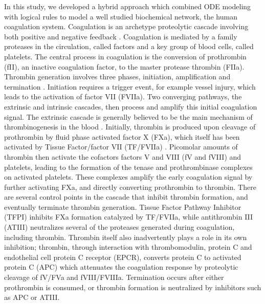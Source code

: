 \documentclass[processes,article,received,moreauthors,pdftex,12pt,a4paper]{mdpi}
\begin{document}
In this study, we developed a hybrid approach which combined ODE modeling with logical rules to model a well studied biochemical network, 
the human coagulation system. Coagulation is an archetype proteolytic cascade involving both positive 
and negative feedback \cite{Butenas:2002aa,Schenone:2004aa,Adams:2009aa}. 
Coagulation is mediated by a family proteases in the circulation, called factors and a key group of blood cells, called platelets. 
The central process in coagulation is the conversion of prothrombin (fII), an inactive coagulation factor, to the master protease thrombin (FIIa).
Thrombin generation involves three phases, initiation, amplification and termination \cite{GOLDHABER2006, Brummel:2002aa}.
Initiation requires a trigger event, for example vessel injury, which leads to the activation of factor VII (FVIIa).
Two converging pathways, the extrinsic and intrinsic cascades, then process and amplify this initial coagulation signal. 
The extrinsic cascade is generally believed to be the main mechanism of thrombinogenesis in the blood \cite{MANN1990,ROBERTS1998,MANN1999}.
Initially, thrombin is produced upon cleavage of prothrombin by fluid phase activated factor X (FXa), which itself has been activated by Tissue Factor/factor VII (TF/FVIIa) \cite{Butenas:2002aa}. 
Picomolar amounts of thrombin then activate the cofactors factors V and VIII (fV and fVIII) and platelets, 
leading to the formation of the tenase and prothrombinase complexes on activated platelets.
These complexes amplify the early coagulation signal by further activating FXa, and directly converting prothrombin to thrombin. 
There are several control points in the cascade that inhibit thrombin formation, and eventually terminate thrombin generation. 
Tissue Factor Pathway Inhibitor (TFPI) inhibits FXa formation catalyzed by TF/FVIIa, while antithrombin III (ATIII)
neutralizes several of the proteases generated during coagulation, including thrombin.  
Thrombin itself also inadvertently plays a role in its own inhibition; thrombin, through interaction with thrombomodulin, protein C and endothelial cell protein C receptor (EPCR),
converts protein C to activated protein C (APC) which attenuates the coagulation response by proteolytic cleavage of fV/FVa and fVIII/FVIIIa. 
Termination occurs after either prothrombin is consumed, or thrombin formation is neutralized by inhibitors such as APC or ATIII.   
\end{document}
